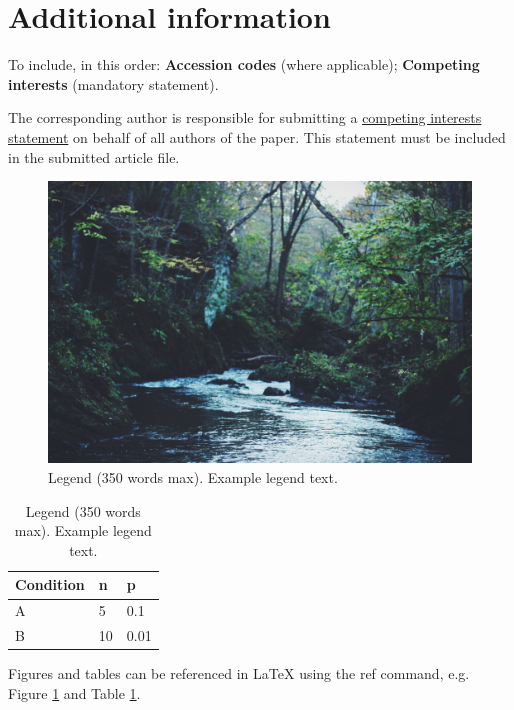 \documentclass[fleqn,14pt]{wlscirep}
\begin{document}
\section*{Additional information}

To include, in this order: \textbf{Accession codes} (where applicable); \textbf{Competing interests} (mandatory statement). 

The corresponding author is responsible for submitting a \href{http://www.nature.com/srep/policies/index.html#competing}{competing interests statement} on behalf of all authors of the paper. This statement must be included in the submitted article file.

\begin{figure}[ht]
\centering
\includegraphics[width=\linewidth]{stream}
\caption{Legend (350 words max). Example legend text.}
\label{fig:stream}
\end{figure}

\begin{table}[ht]
\centering
\begin{tabular}{|l|l|l|}
\hline
Condition & n & p \\
\hline
A & 5 & 0.1 \\
\hline
B & 10 & 0.01 \\
\hline
\end{tabular}
\caption{\label{tab:example}Legend (350 words max). Example legend text.}
\end{table}

Figures and tables can be referenced in LaTeX using the ref command, e.g. Figure \ref{fig:stream} and Table \ref{tab:example}.
\end{document}
